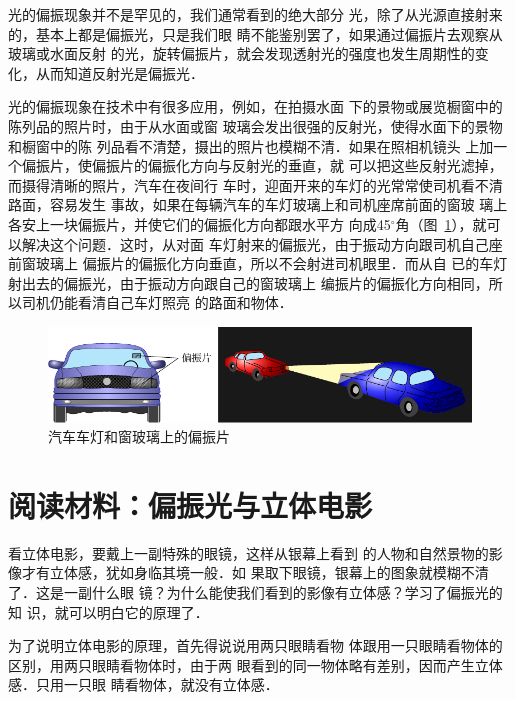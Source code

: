 光的偏振现象并不是罕见的，我们通常看到的绝大部分
光，除了从光源直接射来的，基本上都是偏振光，只是我们眼
睛不能鉴别罢了，如果通过偏振片去观察从玻璃或水面反射
的光，旋转偏振片，就会发现透射光的强度也发生周期性的变
化，从而知道反射光是偏振光．

光的偏振现象在技术中有很多应用，例如，在拍摄水面
下的景物或展览橱窗中的陈列品的照片时，由于从水面或窗
玻璃会发出很强的反射光，使得水面下的景物和橱窗中的陈
列品看不清楚，摄出的照片也模糊不清．如果在照相机镜头
上加一个偏振片，使偏振片的偏振化方向与反射光的垂直，就
可以把这些反射光滤掉，而摄得清晰的照片，汽车在夜间行
车时，迎面开来的车灯的光常常使司机看不清路面，容易发生
事故，如果在每辆汽车的车灯玻璃上和司机座席前面的窗玻
璃上各安上一块偏振片，并使它们的偏振化方向都跟水平方
向成45$^\circ$角（图~\ref{fig_C_6-14}），就可以解决这个问题．这时，从对面
车灯射来的偏振光，由于振动方向跟司机自己座前窗玻璃上
偏振片的偏振化方向垂直，所以不会射进司机眼里．而从自
已的车灯射出去的偏振光，由于振动方向跟自己的窗玻璃上
编振片的偏振化方向相同，所以司机仍能看清自己车灯照亮
的路面和物体．

\begin{figure}[htbp]
    \centering
    \includegraphics{fig/C/6-14.pdf}
    \caption{汽车车灯和窗玻璃上的偏振片}\label{fig_C_6-14}
\end{figure}

\section*{阅读材料：偏振光与立体电影}
看立体电影，要戴上一副特殊的眼镜，这样从银幕上看到
的人物和自然景物的影像才有立体感，犹如身临其境一般．如
果取下眼镜，银幕上的图象就模糊不清了．这是一副什么眼
镜？为什么能使我们看到的影像有立体感？学习了偏振光的知
识，就可以明白它的原理了．

为了说明立体电影的原理，首先得说说用两只眼睛看物
体跟用一只眼睛看物体的区别，用两只眼睛看物体时，由于两
眼看到的同一物体略有差别，因而产生立体感．只用一只眼
睛看物体，就没有立体感．

